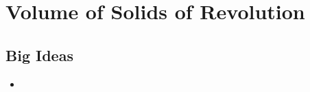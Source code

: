 \chapter{Volume of Solids of Revolution}
\label{chap:VSR}

\section{Big Ideas}
\label{sec:VSR Big Ideas}
\begin{itemize}
  \item 
\end{itemize}